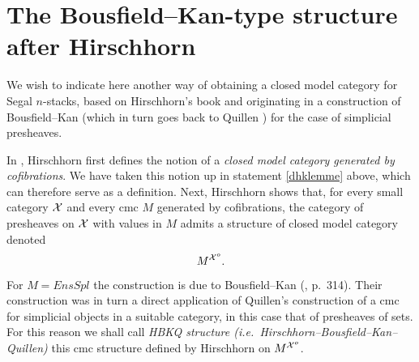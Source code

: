 %

\clearpage
\section{The Bousfield--Kan-type structure after Hirschhorn}
\label{bousfieldkanpage}

We wish to indicate here another way of obtaining a closed model category
for Segal $n$-stacks, based on Hirschhorn's book \cite{Hirschhorn} and
originating in a construction of Bousfield--Kan \cite{BousfieldKan} (which in
turn goes back to Quillen \cite{Quillen}) for the case of simplicial
presheaves.

In \cite{Hirschhorn}, Hirschhorn first defines the notion of a \emph{closed
model category generated by cofibrations}. We have taken this notion up in
statement \ref{dhklemme} above, which can therefore serve as a definition.
Next, Hirschhorn shows that, for every small category ${\cal X}$ and every cmc $M$
generated by cofibrations, the category of presheaves on ${\cal X}$ with values in
$M$ admits a structure of closed model category denoted
$$
M^{{\cal X} ^o}.
$$
For $M=EnsSpl$ the construction is due to Bousfield--Kan (\cite{BousfieldKan},
p.~314). Their construction was in turn a direct application of Quillen's
construction \cite{Quillen} of a cmc for simplicial objects in a suitable
category, in this case that of presheaves of sets. For this reason we shall
call \emph{HBKQ structure (i.e.\ Hirschhorn--Bousfield--Kan--Quillen)} this
cmc structure defined by Hirschhorn on $M^{{\cal X} ^o}$.

